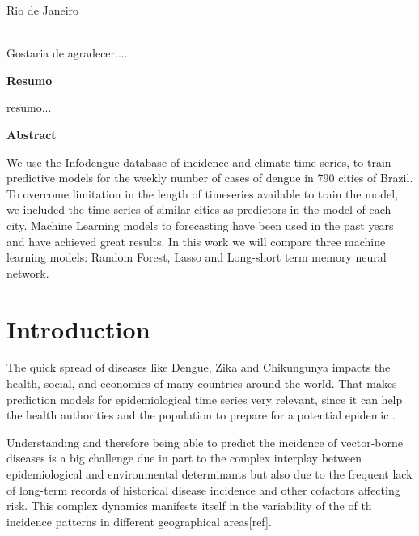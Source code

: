 \documentclass[12pt]{report}
\begin{document}
\par
\vfill
\begin{center}
{{\normalsize Rio de Janeiro}\\
{\normalsize \the\year}}
\end{center}

\thispagestyle{empty}

\newpage
{}\\
\doublespacing
Gostaria de agradecer....

\thispagestyle{empty}

\newpage
\begin{center}
\textbf{\normalsize Resumo}
\end{center}
\vspace{1pt}

resumo...

\thispagestyle{empty}

\newpage
\begin{center}
\textbf{\normalsize Abstract}
\end{center}
\vspace{1pt}

We use the Infodengue database of incidence and climate time-series, to train predictive models for the weekly number of cases of dengue in 790 cities of Brazil. To overcome limitation in the length of timeseries available to train the model, we included the time series of similar cities as predictors in the model of each city. Machine Learning models to forecasting have been used in the past years and have achieved great results. In this work we will compare three machine learning models: Random Forest, Lasso and Long-short term memory neural network.

\thispagestyle{empty}

\newpage
\tableofcontents
\listoffigures
\thispagestyle{empty}

\newpage
\chapter{Introduction}


The quick spread of diseases like Dengue, Zika and Chikungunya impacts the health, social, and economies of many countries around the world. That makes prediction models for epidemiological time series very relevant, since it can help the health authorities and the population to prepare for a potential epidemic \citep{luz2008time}. 


Understanding and therefore being able to predict the incidence of vector-borne diseases is a big challenge due in part to the complex interplay between epidemiological and environmental determinants but also due to the frequent lack of long-term records of historical disease incidence and other cofactors affecting risk. This complex dynamics manifests itself in the variability of the of th incidence patterns in different geographical areas[ref].
\end{document}

